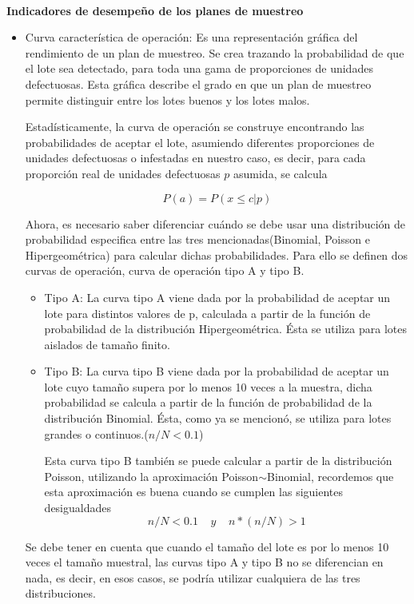~\\\textbf{Indicadores de desempe\~{n}o de los planes de muestreo}
\begin{itemize}
\item Curva caracter\'{i}stica de operaci\'{o}n: Es una representaci\'{o}n gr\'{a}fica del rendimiento de un plan de muestreo. Se crea trazando la probabilidad de que el lote sea detectado, para toda una gama de proporciones de unidades defectuosas. Esta gr\'{a}fica describe el grado en que un plan de muestreo permite distinguir entre los lotes buenos y los lotes malos. \cite{OPE} 

Estad\'{i}sticamente, la curva de operaci\'{o}n se construye encontrando las probabilidades de aceptar el lote, asumiendo diferentes proporciones de unidades defectuosas o infestadas en nuestro caso, es decir, para cada proporci\'{o}n real de unidades defectuosas $p$ asumida, se calcula

$$P(a)=P(x\leq c | p)$$

Ahora, es necesario saber diferenciar cu\'{a}ndo se debe usar una distribuci\'{o}n de probabilidad especifica entre las tres mencionadas(Binomial, Poisson e Hipergeom\'{e}trica) para calcular dichas probabilidades. Para ello se definen dos curvas de operaci\'{o}n, curva de operaci\'{o}n tipo A y tipo B.
\begin{itemize}
\item Tipo A: La curva tipo A viene dada por la probabilidad de aceptar un lote para distintos valores de p, calculada a partir de la funci\'{o}n de probabilidad de la distribuci\'{o}n Hipergeom\'{e}trica. \'{E}sta se utiliza para lotes aislados de tama\~{n}o finito.
\item Tipo B: La curva tipo B viene dada por la probabilidad de aceptar un lote cuyo tama\~{n}o supera por lo menos 10 veces a la muestra, dicha probabilidad se calcula a partir de la funci\'{o}n de probabilidad de la distribuci\'{o}n Binomial. \'{E}sta, como ya se mencion\'{o}, se utiliza para lotes grandes o continuos.($n/N<0.1$)

Esta curva tipo B tambi\'{e}n se puede calcular a partir de la distribuci\'{o}n Poisson, utilizando la aproximaci\'{o}n Poisson$\sim$Binomial, recordemos que esta aproximaci\'{o}n es buena cuando se cumplen las siguientes desigualdades
$$ n/N<0.1 \;\;\;\; y \;\;\;\; n*(n/N)>1 $$
\end{itemize}
Se debe tener en cuenta que cuando el tama\~{n}o del lote es por lo menos 10 veces el tama\~{n}o muestral, las curvas tipo A y tipo B no se diferencian en nada, es decir, en esos casos, se podr\'{i}a utilizar cualquiera de las tres distribuciones.


\end{itemize}
